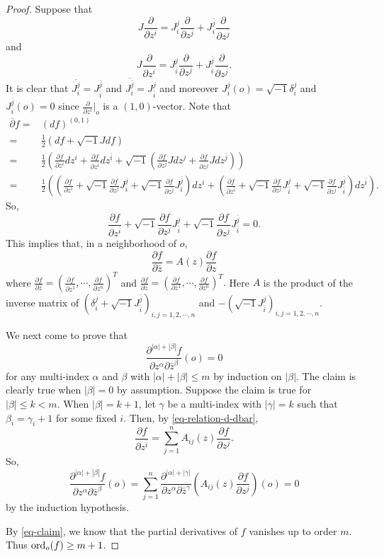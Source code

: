 \documentclass[12pt]{amsart}
\def\ol{\overline}
\def\p{\partial}
\def\ol{\overline}
\def\ii{{\sqrt{-1}}}
\def\dbar{\overline{\partial }}
\theoremstyle{definition}
\theoremstyle{remark}
\numberwithin{equation}{section}
\def\bi{{\bar i}}
\def\bj{{\bar j}}
\def\ord{{\rm ord}}
\begin{document}
\begin{proof}
Suppose that
$$J\frac{\p}{\p z^i}=J_i^j\frac{\p}{\p z^j}+J_i^{\bar j}\frac{\p}{\p z^\bj}$$
and
$$J\frac{\p}{\p z^{\bi}}=J_{\bi}^j\frac{\p}{\p z^j}+J_{\bi}^{\bj}\frac{\p}{\p z^{\bj}}.$$
It is clear that $\ol{J_i^j}=J_\bi^\bj$ and $\ol{J_i^\bj}=J_\bi^j$ and moreover $J_i^j(o)=\ii\delta_i^j$ and $J_i^\bj(o)=0$ since $\frac{\p}{\p z^i}\big|_o$ is a $(1,0)$-vector. Note that
\begin{equation}
\begin{split}
\dbar f=&(df)^{(0,1)}\\
=&\frac{1}{2}(df+\ii Jdf)\\
=&\frac12\left(\frac{\p f}{\p z^i}dz^i+\frac{\p f}{\p z^\bi}dz^\bi+\ii\left(\frac{\p f}{\p z^j}Jdz^j+\frac{\p f}{\p z^\bj}Jdz^\bj\right)\right)\\
=&\frac12\left(\left(\frac{\p f}{\p z^i}+\ii\frac{\p f}{\p z^j}J_i^j+\ii\frac{\p f}{\p z^\bj}J_i^\bj\right)dz^i+\left(\frac{\p f}{\p z^\bi}+\ii\frac{\p f}{\p z^j}J_\bi^j+\ii\frac{\p f}{\p z^\bj}J_\bi^\bj\right)dz^\bi\right).
\end{split}
\end{equation}
So,
\begin{equation}
\frac{\p f}{\p z^\bi}+\ii\frac{\p f}{\p z^j}J_\bi^j+\ii\frac{\p f}{\p z^\bj}J_\bi^\bj=0.
\end{equation}
This implies that, in a neighborhood of $o$,
\begin{equation}\label{eq-relation-d-dbar}
\frac{\p f}{\p \bar z}=A(z)\frac{\p f}{\p z}
\end{equation}
where $\frac{\p f}{\p \bar z}=(\frac{\p f}{\p z^{\bar 1}},\cdots, \frac{\p f}{\p z^{\bar n}})^T$ and $\frac{\p f}{\p z}=(\frac{\p f}{\p z^{ 1}},\cdots, \frac{\p f}{\p z^{ n}})^T.$ Here $A$ is the product of the inverse matrix of $(\delta_i^j+\ii J_\bi^\bj)_{i,j=1,2,\cdots,n}$ and $-(\ii J_\bi^j)_{i,j=1,2,\cdots,n}$.

We next come to prove that
\begin{equation}\label{eq-claim}
\frac{\p^{|\alpha|+|\beta|}f}{\p z^\alpha\p\bar z^\beta}(o)=0
\end{equation}
for any multi-index $\alpha$ and $\beta$ with $|\alpha|+|\beta|\leq m$ by induction on $|\beta|$. The claim is clearly true when $|\beta|=0$ by assumption. Suppose the claim is true for $|\beta|\leq k<m$. When $|\beta|=k+1$, let $\gamma$ be a multi-index with $|\gamma|=k$ such that $\beta_i=\gamma_i+1$ for some fixed $i$. Then, by \eqref{eq-relation-d-dbar}, \begin{equation}
\frac{\p f}{\p z^\bi}=\sum_{j=1}^nA_{ij}(z)\frac{\p f}{\p z^j}.
\end{equation}
So,
\begin{equation}
\frac{\p^{|\alpha|+|\beta|}f}{\p z^\alpha\p \bar z^\beta}(o)=\sum_{j=1}^n\frac{\p^{|\alpha|+|\gamma|}}{\p z^\alpha\p \bar z^\gamma}\left(A_{ij}(z)\frac{\p f}{\p z^j}\right)(o)=0
\end{equation}
by the induction hypothesis.

By \eqref{eq-claim}, we know that the partial derivatives of $f$ vanishes up to order $m$. Thus $\ord_o(f)\geq m+1$.
\end{proof}
\end{document}
